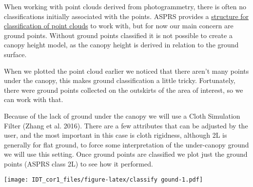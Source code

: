 \documentclass[
]{article}
\newenvironment{Shaded}{\begin{snugshade}}{\end{snugshade}}
\newcommand{\AttributeTok}[1]{\textcolor[rgb]{0.77,0.63,0.00}{#1}}
\newcommand{\DecValTok}[1]{\textcolor[rgb]{0.00,0.00,0.81}{#1}}
\newcommand{\FunctionTok}[1]{\textcolor[rgb]{0.00,0.00,0.00}{#1}}
\newcommand{\NormalTok}[1]{#1}
\newcommand{\OtherTok}[1]{\textcolor[rgb]{0.56,0.35,0.01}{#1}}
\newcommand{\SpecialCharTok}[1]{\textcolor[rgb]{0.00,0.00,0.00}{#1}}
\begin{document}
When working with point clouds derived from photogrammetry, there is
often no classifications initially associated with the points. ASPRS
provides a
\href{chrome-extension://efaidnbmnnnibpcajpcglclefindmkaj/viewer.html?pdfurl=https\%3A\%2F\%2Fwww.asprs.org\%2Fwp-content\%2Fuploads\%2F2010\%2F12\%2FLAS_Specification.pdf\&clen=3783348\&chunk=true}{structure
for classification of point clouds} to work with, but for now our main
concern are ground points. Without ground points classified it is not
possible to create a canopy height model, as the canopy height is
derived in relation to the ground surface.

When we plotted the point cloud earlier we noticed that there aren't
many points under the canopy, this makes ground classification a little
tricky. Fortunately, there were ground points collected on the outskirts
of the area of interest, so we can work with that.

Because of the lack of ground under the canopy we will use a Cloth
Simulation Filter (Zhang et al. 2016). There are a few attributes that
can be adjusted by the user, and the most important in this case is
cloth rigidness, although 2L is generally for flat ground, to force some
interpretation of the under-canopy ground we will use this setting. Once
ground points are classified we plot just the ground points (ASPRS class
2L) to see how it performed.

\begin{Shaded}
\end{Shaded}

\texttt{[image: IDT\_cor1\_files/figure-latex/classify gound-1.pdf]}

\begin{Shaded}
\end{Shaded}
\end{document}
